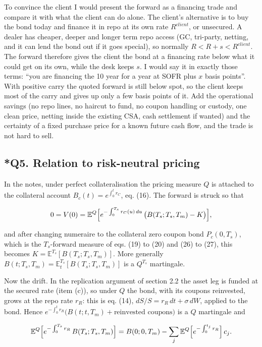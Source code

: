 \documentclass[11pt]{article}
\begin{document}
To convince the client I would present the forward as a financing trade and compare it with what the client can do alone. The client's alternative is to buy the bond today and finance it in repo at its own rate $R^{client}$, or unsecured. A dealer has cheaper, deeper and longer term repo access (GC, tri-party, netting, and it can lend the bond out if it goes special), so normally $R < R + s < R^{client}$. The forward therefore gives the client the bond at a financing rate below what it could get on its own, while the desk keeps $s$. I would say it in exactly those terms: ``you are financing the 10 year for a year at SOFR plus $x$ basis points''. With positive carry the quoted forward is still below spot, so the client keeps most of the carry and gives up only a few basis points of it. Add the operational savings (no repo lines, no haircut to fund, no coupon handling or custody, one clean price, netting inside the existing CSA, cash settlement if wanted) and the certainty of a fixed purchase price for a known future cash flow, and the trade is not hard to sell.

\subsection*{*Q5. Relation to risk-neutral pricing}

In the notes, under perfect collateralisation the pricing measure $Q$ is attached to the collateral account $B_c(t) = e^{\int_0^t r_C}$, eq. (16). The forward is struck so that

\[0 = V(0) = \mathbb{E}^{Q}\Bigl[e^{-\int_0^{T_s} r_C(u)\,du}\,\bigl(B(T_s;T_s,T_m) - K\bigr)\Bigr],\]

and after changing numeraire to the collateral zero coupon bond $P_c(0,T_s)$, which is the $T_s$-forward measure of eqs. (19) to (20) and (26) to (27), this becomes $K = \mathbb{E}^{T_s}[B(T_s;T_s,T_m)]$. More generally $B(t;T_s,T_m) = \mathbb{E}^{T_s}_t[B(T_s;T_s,T_m)]$ is a $Q^{T_s}$ martingale.

Now the drift. In the replication argument of section 2.2 the asset leg is funded at the secured rate (item (c)), so under $Q$ the bond, with its coupons reinvested, grows at the repo rate $r_R$: this is eq. (14), $dS/S = r_R\,dt + \sigma\,dW$, applied to the bond. Hence $e^{-\int_0^t r_R}\bigl(B(t;t,T_m) + \text{reinvested coupons}\bigr)$ is a $Q$ martingale and

\[\mathbb{E}^{Q}\Bigl[e^{-\int_0^{T_s} r_R}\,B(T_s;T_s,T_m)\Bigr] = B(0;0,T_m) - \sum_j \mathbb{E}^{Q}\Bigl[e^{-\int_0^{t_j} r_R}\Bigr]\,c_j .\]
\end{document}
